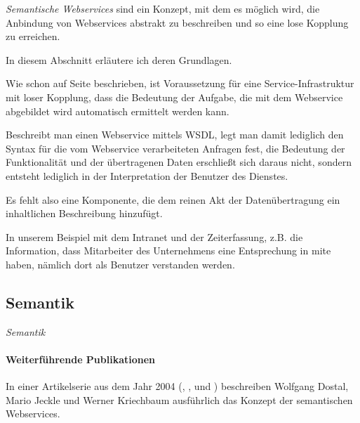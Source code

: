 
\emph{Semantische Webservices} sind ein Konzept, mit dem es möglich wird, die Anbindung von Webservices abstrakt zu beschreiben und so eine lose Kopplung zu erreichen.

In diesem Abschnitt erläutere ich deren Grundlagen.

Wie schon auf Seite \pageref{l:intro-loosecoupling} beschrieben, ist Voraussetzung für eine Service-Infrastruktur mit loser Kopplung, dass die Bedeutung der Aufgabe, die mit dem Webservice abgebildet wird automatisch ermittelt werden kann.\cite{xmlspek1}

Beschreibt man einen Webservice mittels \ac{WSDL}, legt man damit lediglich den Syntax für die vom Webservice verarbeiteten Anfragen fest, die Bedeutung der Funktionalität und der übertragenen Daten erschließt sich daraus nicht, sondern entsteht lediglich in der Interpretation der Benutzer des Dienstes.

Es fehlt also eine Komponente, die dem reinen Akt der Datenübertragung ein inhaltlichen Beschreibung hinzufügt.

In unserem Beispiel mit dem Intranet und der Zeiterfassung, z.B. die Information, dass Mitarbeiter des Unternehmens eine Entsprechung in \ac{mite} haben, nämlich dort als Benutzer verstanden werden.

\subsection{Semantik}

\emph{Semantik}

\paragraph{Weiterführende Publikationen} In einer Artikelserie aus dem Jahr 2004 (\cite{xmlspek1}, \cite{xmlspek2}, \cite{xmlspek3} und \cite{xmlspek4}) beschreiben Wolfgang Dostal, Mario Jeckle und Werner Kriechbaum ausführlich das Konzept der semantischen Webservices.